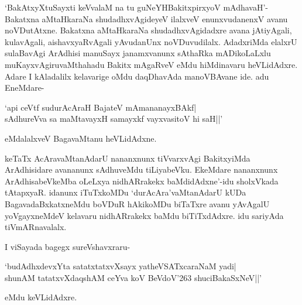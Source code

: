 `BakAtxyXtuSayxti keVvalaM na tu guNeYHBakitxpirxyoV mAdhavaH'-Bakatxna aMtaHkaraNa shudadhxvAgideyeV ilalxveV enunxvudanenxV avanu noVDutAtxne. Bakatxna aMtaHkaraNa shudadhxvAgidadxre avana jAtiyAgali, kulavAgali, aishavxyaRvAgali yAvudanUnx noVDuvudilalx. AdadxriMda elalxrU sulaBavAgi ArAdhisi manuSayx janamxvanunx sAthaRka mADikoLaLxlu muKayxvAgiruvaMthahadu Bakitx mAgaRveV eMdu hiMdinavaru heVLidAdxre. Adare I kAladalilx kelavarige oMdu daqDhavAda manoVBAvane ide. adu EneMdare-

\begin{shloka}
`api ceVtf sudurAcAraH BajateV mAmananayxBAkf|\\
sAdhureVva sa maMtavayxH samayxkf vayxvasitoV hi saH||'
\end{shloka}

eMdalalxveV BagavaMtanu heVLidAdxne.

keTaTx AcAravaMtanAdarU nananxnunx tiVvarxvAgi BakitxyiMda ArAdhisidare avananunx sAdhuveMdu tiLiyabeVku. EkeMdare nananxnunx ArAdhisabeVkeMba oLeLxya nidhARrakekx baMdidAdxne'-idu sholxVkada tAtapxyaR. idanunx iTuTxkoMDu `durAcAra'vaMtanAdarU kUDa BagavadaBxkatxneMdu boVDuR hAkikoMDu biTaTxre avanu yAvAgalU yoVgayxneMdeV kelavaru nidhARrakekx baMdu biTiTxdAdxre. idu sariyAda tiVmARnavalalx.

I viSayada bagegx sureVshavxraru-

\begin{shloka}
`budAdhxdevxYta satatxtatxvXsayx yatheVSATxcaraNaM yadi|\\
shunAM tatatxvXdaqshAM ceYva koV BeVdoV\char'263 shuciBakaSxNeV||'
\end{shloka}

eMdu keVLidAdxre.

